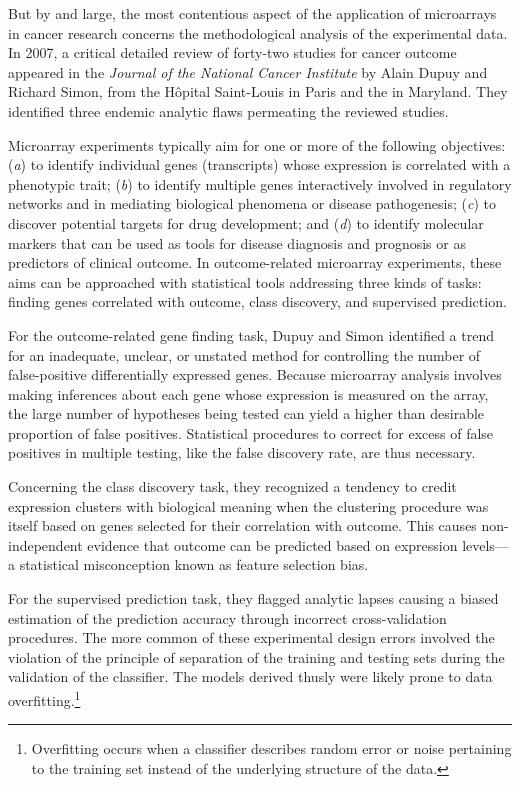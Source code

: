 But by and large, the most contentious aspect of the application of microarrays
in cancer research concerns the methodological analysis of the experimental
data.  In 2007, a critical detailed review of \mbox{forty-two} studies for
cancer outcome appeared in the \emph{Journal of the National Cancer Institute}
by Alain Dupuy and Richard Simon, from the Hôpital Saint-Louis in Paris and the
 in Maryland.\cite{dupuy_critical_2007} They
identified three endemic analytic flaws permeating the reviewed studies.

Microarray experiments typically aim for one or more of the following
objectives: (\emph{a}) to identify individual genes (transcripts) whose
expression is correlated with a phenotypic trait; (\emph{b}) to identify
multiple genes interactively involved in regulatory networks and in mediating
biological phenomena or disease pathogenesis; (\emph{c}) to discover potential
targets for drug development; and (\emph{d}) to identify molecular markers that
can be used as tools for disease diagnosis and prognosis or as predictors of
clinical outcome.\cite{kim_expectations_2010} In \mbox{outcome-related}
microarray experiments, these aims can be approached with statistical tools
addressing three kinds of tasks: finding genes correlated with outcome, class
discovery, and supervised prediction.

For the outcome-related gene finding task, Dupuy and Simon identified a trend
for an inadequate, unclear, or unstated method for controlling the number of
\mbox{false-positive} differentially expressed genes.  Because microarray
analysis involves making inferences about each gene whose expression is measured
on the array, the large number of hypotheses being tested can yield a higher
than desirable proportion of false positives.  Statistical procedures to correct
for excess of false positives in multiple testing, like the false discovery
rate, are thus necessary.\cite{benjamini_controlling_1995,noble_how_2009}

Concerning the class discovery task, they recognized a tendency to credit
expression clusters with biological meaning when the clustering procedure was
itself based on genes selected for their correlation with outcome.  This causes
non-independent evidence that outcome can be predicted based on expression
levels---a statistical misconception known as feature selection
bias.\cite{ambroise_selection_2002}

For the supervised prediction task, they flagged analytic lapses causing a
biased estimation of the prediction accuracy through incorrect cross-validation
procedures.  The more common of these experimental design errors involved the
violation of the principle of separation of the training and testing sets during
the validation of the classifier.  The models derived thusly were likely prone
to data overfitting.\footnote{Overfitting occurs when a classifier describes
  random error or noise pertaining to the training set instead of the underlying
  structure of the data.}

